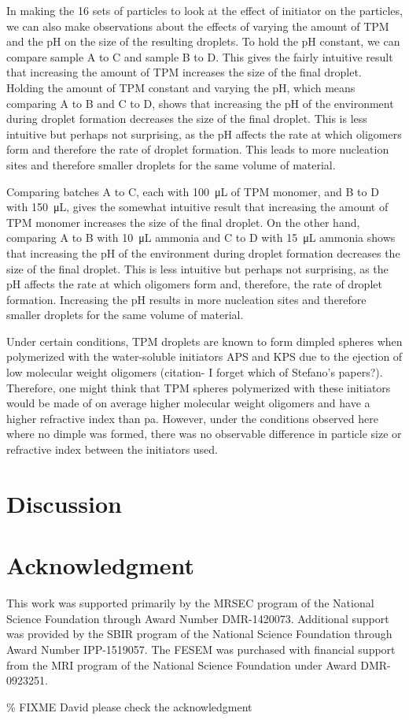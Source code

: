 In making the \si{16} sets of particles to look at the effect of initiator on 
the particles, we can also make observations about the effects of varying 
the amount of TPM and the pH on the size of the resulting droplets. To hold 
the pH constant, we can compare sample A to C and sample B to D. This gives 
the fairly intuitive result that increasing the amount of TPM increases the 
size of the final droplet. Holding the amount of TPM constant and varying 
the pH, which means comparing A to B and C to D, shows that increasing the 
pH of the environment during droplet formation decreases the size of the 
final droplet. This is less intuitive but perhaps not surprising, as the pH 
affects the rate at which oligomers form and therefore the rate of droplet 
formation. This leads to more nucleation sites and therefore smaller droplets 
for the same volume of material. 

Comparing batches A to C, each with \SI{100}{\micro \liter} of TPM monomer, and B to D with
\SI{150}{\micro \liter}, gives the somewhat intuitive result that increasing the amount of TPM
monomer increases the size of the final droplet. On the other hand, comparing A to B with
\SI{10}{\micro \liter} ammonia and C to D with \SI{15}{\micro \liter} ammonia shows that
increasing the pH of the environment during droplet formation decreases the size of the 
final droplet. This is less intuitive but perhaps not surprising, as the pH 
affects the rate at which oligomers form and, therefore, the rate of droplet 
formation. Increasing the pH results in more nucleation sites and therefore smaller droplets 
for the same volume of material. 

Under certain conditions, TPM droplets are known to form dimpled spheres when polymerized with
the water-soluble initiators APS and KPS due to the ejection of low molecular weight oligomers
(citation- I forget which of Stefano's papers?). Therefore, one might think that TPM spheres
polymerized with these initiators would be made of on average higher molecular weight oligomers
and have a higher refractive index than pa. However, under the conditions observed here where no
dimple was formed, there was no observable difference in particle size or refractive index between
the initiators used.

\section{Discussion}

\section{Acknowledgment}

This work was supported primarily by the MRSEC program of
the National Science Foundation through Award Number DMR-1420073.
Additional support was provided by the SBIR program of the
National Science Foundation through Award Number IPP-1519057.
The FESEM was purchased with financial support from the MRI program
of the National Science Foundation under Award DMR-0923251.

\% FIXME David please check the acknowledgment
